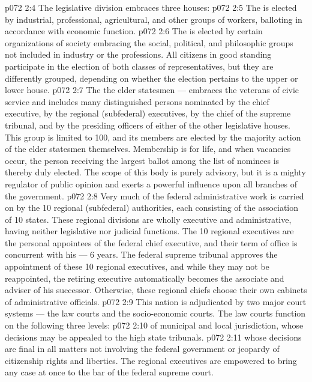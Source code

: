 \vs p072 2:4 \pc The legislative division embraces three houses:
\vs p072 2:5 \bibnobreakspace The  is elected by industrial, professional, agricultural, and other groups of workers, balloting in accordance with economic function.
\vs p072 2:6 \bibnobreakspace The  is elected by certain organizations of society embracing the social, political, and philosophic groups not included in industry or the professions. All citizens in good standing participate in the election of both classes of representatives, but they are differently grouped, depending on whether the election pertains to the upper or lower house.
\vs p072 2:7 \bibnobreakspace The  the elder statesmen --- embraces the veterans of civic service and includes many distinguished persons nominated by the chief executive, by the regional (subfederal) executives, by the chief of the supreme tribunal, and by the presiding officers of either of the other legislative houses. This group is limited to 100, and its members are elected by the majority action of the elder statesmen themselves. Membership is for life, and when vacancies occur, the person receiving the largest ballot among the list of nominees is thereby duly elected. The scope of this body is purely advisory, but it is a mighty regulator of public opinion and exerts a powerful influence upon all branches of the government.
\vs p072 2:8 \pc Very much of the federal administrative work is carried on by the 10 regional (subfederal) authorities, each consisting of the association of 10 states. These regional divisions are wholly executive and administrative, having neither legislative nor judicial functions. The 10 regional executives are the personal appointees of the federal chief executive, and their term of office is concurrent with his --- 6 years. The federal supreme tribunal approves the appointment of these 10 regional executives, and while they may not be reappointed, the retiring executive automatically becomes the associate and adviser of his successor. Otherwise, these regional chiefs choose their own cabinets of administrative officials.
\vs p072 2:9 \pc This nation is adjudicated by two major court systems --- the law courts and the socio\hyp{}economic courts. The law courts function on the following three levels:
\vs p072 2:10 \bibnobreakspace {} of municipal and local jurisdiction, whose decisions may be appealed to the high state tribunals.
\vs p072 2:11 \bibnobreakspace {} whose decisions are final in all matters not involving the federal government or jeopardy of citizenship rights and liberties. The regional executives are empowered to bring any case at once to the bar of the federal supreme court.
